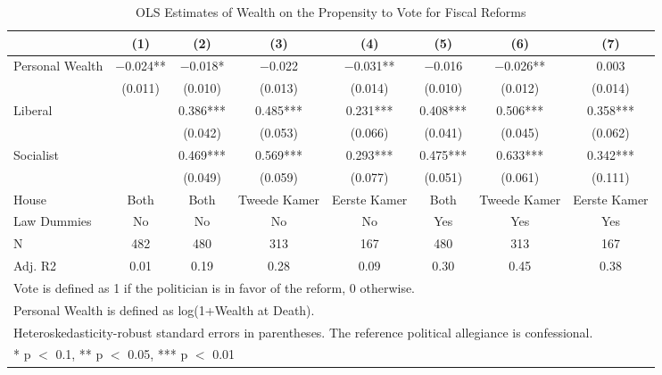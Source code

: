 \begin{table}

\caption{\label{tab:baseline_ols}OLS Estimates of Wealth on the Propensity to Vote for Fiscal Reforms}
\centering
\begin{tabular}[t]{lccccccc}
\toprule
  & (1) & (2) & (3) & (4) & (5) & (6) & (7)\\
\midrule
Personal Wealth & \num{-0.024}** & \num{-0.018}* & \num{-0.022} & \num{-0.031}** & \num{-0.016} & \num{-0.026}** & \num{0.003}\\
 & (\num{0.011}) & (\num{0.010}) & (\num{0.013}) & (\num{0.014}) & (\num{0.010}) & (\num{0.012}) & (\num{0.014})\\
Liberal &  & \num{0.386}*** & \num{0.485}*** & \num{0.231}*** & \num{0.408}*** & \num{0.506}*** & \num{0.358}***\\
 &  & (\num{0.042}) & (\num{0.053}) & (\num{0.066}) & (\num{0.041}) & (\num{0.045}) & (\num{0.062})\\
Socialist &  & \num{0.469}*** & \num{0.569}*** & \num{0.293}*** & \num{0.475}*** & \num{0.633}*** & \num{0.342}***\\
 &  & (\num{0.049}) & (\num{0.059}) & (\num{0.077}) & (\num{0.051}) & (\num{0.061}) & (\num{0.111})\\
\midrule
House & Both & Both & Tweede Kamer & Eerste Kamer & Both & Tweede Kamer & Eerste Kamer\\
Law Dummies & No & No & No & No & Yes & Yes & Yes\\
N & \num{482} & \num{480} & \num{313} & \num{167} & \num{480} & \num{313} & \num{167}\\
Adj. R2 & \num{0.01} & \num{0.19} & \num{0.28} & \num{0.09} & \num{0.30} & \num{0.45} & \num{0.38}\\
\bottomrule
\multicolumn{8}{l}{\rule{0pt}{1em}Vote is defined as 1 if the politician is in favor of the reform, 0 otherwise.}\\
\multicolumn{8}{l}{\rule{0pt}{1em}Personal Wealth is defined as log(1+Wealth at Death).}\\
\multicolumn{8}{l}{\rule{0pt}{1em}Heteroskedasticity-robust standard errors in parentheses. The reference political allegiance is confessional.}\\
\multicolumn{8}{l}{\rule{0pt}{1em}* p $<$ 0.1, ** p $<$ 0.05, *** p $<$ 0.01}\\
\end{tabular}
\end{table}
